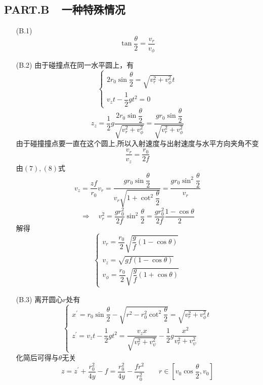 \documentclass{article}
\begin{document}
\subsection*{PART.B\ \ 一种特殊情况}
\begin{itemize}
    \item[(B.1)]\[\tan\dfrac{\theta}{2}=\frac{v_{r}}{v_{\phi}}\tag{6}\]
    \item[(B.2)]由于碰撞点在同一水平圆上，有
    \[\begin{cases}2r_{0}\sin\dfrac{\theta}{2}=\sqrt{v_{r}^{2}+v_{\phi}^{2}}t\\v_{z}t-\dfrac{1}{2}gt^{2}=0\end{cases}\]
    \[z_{z}=\dfrac{1}{2}g\frac{2r_{0}\sin\dfrac{\theta}{2}}{\sqrt{v_{r}^{2}+v_{\phi}^{2}}}=\dfrac{gr_{0}\sin\dfrac{\theta}{2}}{\sqrt{v_{r}^{2}+v_{\phi}^{2}}}\tag{7}\]
    由于碰撞撞点要一直在这个圆上,所以入射速度与出射速度与水平方向夹角不变
    \[\dfrac{v_r}{v_z}=\dfrac{r_0}{2f}\tag{8}\]
    由$(7),(8)$式
    \[v_z=\dfrac{zf}{r_{0}}v_r=\frac{gr_{0}\sin\dfrac\theta2}{v_r\sqrt{1+\cot^{2}\dfrac\theta2}}=\dfrac{gr_{0}\sin^{2}\dfrac\theta2}{v_r}\]
    \[\Rightarrow\quad v_r^{2}=\dfrac{gr_{0}^{2}}{2f}\sin^{2}\frac{\theta}{2}=\dfrac{gr_{0}^{2}}{2f}\dfrac{1-\cos\theta}{2}\]
    解得
    \[\begin{cases}v_{r}=\dfrac{r_{0}}{2}\sqrt{\dfrac{g}{f}(1-\cos\theta)}\\v_{z}=\sqrt{gf(1-\cos\theta)}\\v_{\phi}=\dfrac{r_{0}}{2}\sqrt{\dfrac{g}{f}(1+\cos\theta)}\end{cases}\tag{9,10,11}\]
    \item[(B.3)]离开圆心$r$处有
    \[\begin{cases}x^{\prime}=r_0\sin\dfrac{\theta}{2}-\sqrt{r^2-r_0^2\cot^2\dfrac{\theta}{2}}=\sqrt{v_{r}^2+v_{\phi}^2}t\\
        z^{\prime}=v_zt-\dfrac{1}{2}gt^2=\dfrac{v_zx}{\sqrt{v_{r}^2+v_{\psi}^2}}-\dfrac12g\dfrac{x^2}{v_{r}^2+v_{\psi}^2}\end{cases}\]
        化简后可得与$\theta$无关
        \[z=z^{\prime}+\frac{r_{0}^{2}}{4y}-f=\frac{r_{0}^{2}}{4y}-\frac{fr^{2}}{r_{0}^{2}}\qquad r\in[v_{0}\cos\dfrac\theta2,v_{0}]\] 
\end{itemize}
\end{document}
